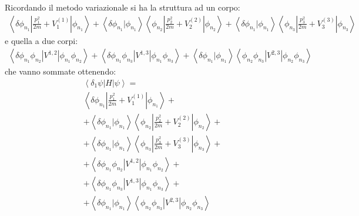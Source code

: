 Ricordando il metodo variazionale si ha la struttura ad un corpo:
\begin{equation}\begin{split}
\left\langle \delta\phi_{n_1}|\frac{p_1^2}{2m}+V_1^{\left(1\right)}|\phi_{n_1} \right\rangle+\left\langle \delta\phi_{n_1}|\phi_{n_1} \right\rangle\left\langle \phi_{n_2}|\frac{p_2^2}{2m}+V_2^{\left(2\right)}|\phi_{n_2} \right\rangle+\left\langle \delta\phi_{n_1}|\phi_{n_1} \right\rangle\left\langle \phi_{n_3}|\frac{p_3^2}{2m}+V_3^{\left(3\right)}|\phi_{n_3} \right\rangle
\end{split}\end{equation}
e quella a due corpi:
\begin{equation}\begin{split}
\left\langle \delta\phi_{n_1}\phi_{n_2}|V^{1,2}|\phi_{n_1}\phi_{n_2} \right\rangle+\left\langle \delta\phi_{n_1}\phi_{n_3}|V^{1,3}|\phi_{n_1}\phi_{n_3} \right\rangle+\left\langle \delta\phi_{n_1}|\phi_{n_1} \right\rangle\left\langle \phi_{n_2}\phi_{n_3}|V^{2,3}|\phi_{n_2}\phi_{n_3} \right\rangle
\end{split}\end{equation}
che vanno sommate ottenendo:
\begin{equation}\begin{split}
\left\langle \delta_1\psi |H|\psi  \right\rangle=\\
\left\langle \delta\phi_{n_1}|\frac{p_1^2}{2m}+V_1^{\left(1\right)}|\phi_{n_1} \right\rangle+\\
+\left\langle \delta\phi_{n_1}|\phi_{n_1} \right\rangle\left\langle \phi_{n_2}|\frac{p_2^2}{2m}+V_2^{\left(2\right)}|\phi_{n_2} \right\rangle+\\
+\left\langle \delta\phi_{n_1}|\phi_{n_1} \right\rangle\left\langle \phi_{n_3}|\frac{p_3^2}{2m}+V_3^{\left(3\right)}|\phi_{n_3} \right\rangle+\\
+\left\langle \delta\phi_{n_1}\phi_{n_2}|V^{1,2}|\phi_{n_1}\phi_{n_2} \right\rangle+\\
+\left\langle \delta\phi_{n_1}\phi_{n_3}|V^{1,3}|\phi_{n_1}\phi_{n_3} \right\rangle+\\
+\left\langle \delta\phi_{n_1}|\phi_{n_1} \right\rangle\left\langle \phi_{n_2}\phi_{n_3}|V^{2,3}|\phi_{n_2}\phi_{n_3} \right\rangle
\end{split}\end{equation}


